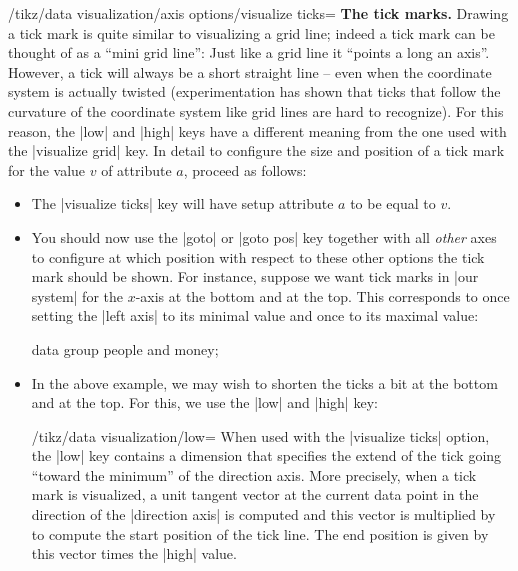 \begin{key}{/tikz/data visualization/axis options/visualize ticks=}
    \medskip
    \textbf{The tick marks.}
    Drawing a tick mark is quite similar to visualizing a grid line; indeed a
    tick mark can be thought of as a ``mini grid line'': Just like a grid line
    it ``points a long an axis''. However, a tick will always be a short
    straight line -- even when the coordinate system is actually twisted
    (experimentation has shown that ticks that follow the curvature of the
    coordinate system like grid lines are hard to recognize). For this reason,
    the |low| and |high| keys have a different meaning from the one used with
    the |visualize grid| key. In detail to configure the size and position of a
    tick mark for the value $v$ of attribute $a$, proceed as follows:
    \begin{itemize}
        \item The |visualize ticks| key will have setup attribute $a$ to be
            equal to $v$.
        \item You should now use the |goto| or |goto pos| key together with all
            \emph{other} axes to configure at which position with respect to
            these other options the tick mark should be shown. For instance,
            suppose we want tick marks in |our system| for the $x$-axis at the
            bottom and at the top. This corresponds to once setting the
            |left axis| to its minimal value and once to its maximal value:
\begin{codeexample}[preamble={\usetikzlibrary{datavisualization}}]
%
\tikz \datavisualization [
    our system,
    x axis={attribute=time, length=3cm, ticks=many},
    left axis ={attribute=money},
    right axis={attribute=people},
    visualize as line/.list={people 1, people 2, money 1, money 2}]
  data group {people and money};
\end{codeexample}
        \item In the above example, we may wish to shorten the ticks a bit at
            the bottom and at the top. For this, we use the |low| and |high|
            key:
            \begin{key}{/tikz/data visualization/low=}
                When used with the |visualize ticks| option, the |low| key
                contains a dimension that specifies the extend of the tick
                going ``toward the minimum'' of the direction axis. More
                precisely, when a tick mark is visualized, a unit tangent
                vector at the current data point in the direction of the
                |direction axis| is computed and this vector is multiplied by
                 to compute the start position of the tick
                line. The end position is given by this vector times the |high|
                value.


\end{key}
\end{itemize}
\end{key}
